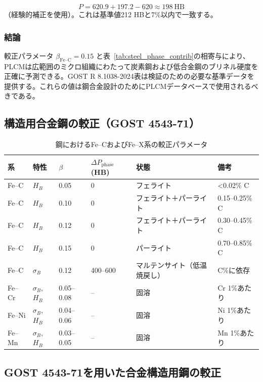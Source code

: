 \documentclass[12pt,a4paper]{article}
\begin{document}
	\[
	P = 620.9 + 197.2 - 620 \approx 198\ \text{HB}
	\]
	（経験的補正を使用）。これは基準値212 HBと7\%以内で一致する。
	
	\subsubsection{結論}
	
	較正パラメータ $\beta_{\text{Fe–C}} = 0.15$ と表~\ref{tab:steel_phase_contrib}の相寄与により、PLCMは広範囲のミクロ組織にわたって炭素鋼および低合金鋼のブリネル硬度を正確に予測できる。GOST R 8.1038-2024表は検証のための必要な基準データを提供する。これらの値は鋼合金設計のためにPLCMデータベースで使用されるべきである。
	
	\subsection{構造用合金鋼の較正（GOST 4543-71）}
	\begin{longtable}{p{2.5cm} p{1.2cm} p{1.2cm} p{1.5cm} p{2.0cm} p{2.0cm}}
		\caption{鋼におけるFe–CおよびFe–X系の較正パラメータ}\\
		\toprule
		\textbf{系} & \textbf{特性} & $\beta$ & $\Delta P_{\text{phase}}$ (HB) & \textbf{状態} & \textbf{備考} \\
		\midrule
		Fe–C & $H_B$ & 0.05 & 0 & フェライト & <0.02\% C \\
		Fe–C & $H_B$ & 0.10 & 0 & フェライト＋パーライト & 0.15–0.25\% C \\
		Fe–C & $H_B$ & 0.12 & 0 & フェライト＋パーライト & 0.30–0.45\% C \\
		Fe–C & $H_B$ & 0.15 & 0 & パーライト & 0.70–0.85\% C \\
		Fe–C & $\sigma_B$ & 0.12 & 400–600 & マルテンサイト（低温焼戻し） & C\%に依存 \\
		Fe–Cr & $\sigma_B$, $H_B$ & 0.05–0.08 & – & 固溶 & Cr 1\%あたり \\
		Fe–Ni & $\sigma_B$, $H_B$ & 0.04–0.06 & – & 固溶 & Ni 1\%あたり \\
		Fe–Mn & $\sigma_B$, $H_B$ & 0.03–0.05 & – & 固溶 & Mn 1\%あたり \\
		\bottomrule
	\end{longtable}
	
	
	\subsection{GOST 4543-71を用いた合金構造用鋼の較正}
	\label{subsec:steel_calibration_gost4543}
	
\end{document}
